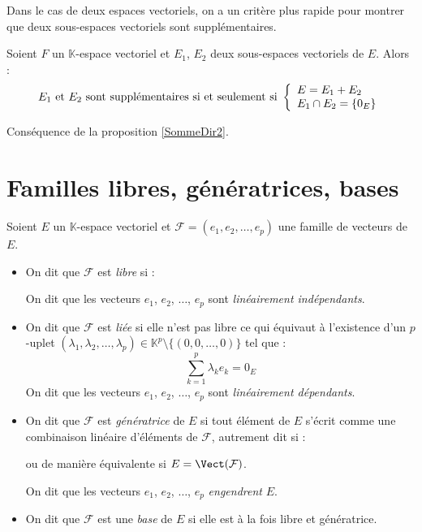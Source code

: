\documentclass[french,11pt,twoside]{VcCours}
\begin{document}
Dans le cas de deux espaces vectoriels, on a un critère plus rapide pour montrer que deux sous-espaces vectoriels sont supplémentaires.

 \begin{Proposition}{}
 Soient $F$ un $\mathbb{K}$-espace vectoriel et $E_1$, $E_2$ deux sous-espaces vectoriels de $E$. Alors :
 $$ E_1 \hbox{ et } E_2 \hbox{ sont supplémentaires si et seulement si } \left\lbrace\begin{array}{l}
 E=E_1+ E_2 \\
 E_1 \cap E_2 = \lbrace 0_E \rbrace
 \end{array}\right.$$
 \end{Proposition}
 
 \begin{Demonstration}{}
 Conséquence de la proposition \ref{SommeDir2}.
 \end{Demonstration}

\newpage
 \section{Familles libres, génératrices, bases}
 
 \begin{Definition}{}
Soient $E$ un $\mathbb{K}$-espace vectoriel et $\mathcal{F} = (e_1, e_2, \ldots, e_p)$ une famille de vecteurs de $E$.

\begin{itemize}
\item On dit que $\mathcal{F}$ est \emph{libre} si  :

\vspace{1cm}
%
On dit que les vecteurs $e_1$, $e_2$, $\ldots$, $e_p$ sont \emph{linéairement indépendants}.
\item On dit que $\mathcal{F}$ est \emph{liée} si elle n'est pas libre ce qui équivaut à l'existence d'un $p$-uplet \newline $(\lambda_1, \lambda_2, \ldots, \lambda_p) \in \mathbb{K}^p \setminus \lbrace (0,0, \ldots,0) \rbrace$ tel que :
$$ \sum_{k=1}^p \lambda_k e_k = 0_E$$
On dit que les vecteurs $e_1$, $e_2$, $\ldots$, $e_p$ sont \emph{linéairement dépendants}.
\item On dit que $\mathcal{F}$ est \emph{génératrice} de $E$ si tout élément de $E$ s'écrit comme une combinaison linéaire d'éléments de $\mathcal{F}$, autrement dit si :

\vspace{1cm}

ou de manière équivalente si $E = \Vect(\mathcal{F})$.

On dit que les vecteurs $e_1$, $e_2$, $\ldots$, $e_p$ \emph{engendrent} $E$.
\item On dit que $\mathcal{F}$ est une \emph{base} de $E$ si elle est à la fois libre et génératrice.
\end{itemize}
\end{Definition}
\end{document}
